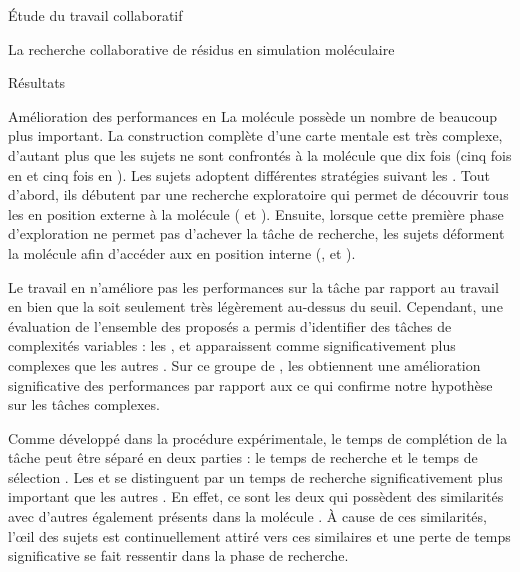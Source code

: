 \documentclass[myfrancais]{mythesis}
\begin{document}
\begin{mypart}{Étude du travail collaboratif}
\begin{mychapter}{La recherche collaborative de résidus en simulation moléculaire}
\begin{mysection}{Résultats}
\begin{mysubsection}{Amélioration des performances en }
					La molécule \myPrion possède un nombre de  beaucoup plus important.
					La construction complète d'une carte mentale est très complexe, d'autant plus que les sujets ne sont confrontés à la molécule que dix fois (cinq fois en  et cinq fois en ).
					Les sujets adoptent différentes stratégies suivant les .
					Tout d'abord, ils débutent par une recherche exploratoire qui permet de découvrir tous les   en position externe à la molécule ( et ).
					Ensuite, lorsque cette première phase d'exploration ne permet pas d'achever la tâche de recherche, les sujets déforment la molécule afin d'accéder aux  en position interne (,  et ).

					Le travail en  n'améliore pas les performances sur la tâche par rapport au travail en  bien que la \mypvalue soit seulement très légèrement au-dessus du seuil.
					Cependant, une évaluation de l'ensemble des  proposés a permis d'identifier des tâches de complexités variables : les  ,  et  apparaissent comme significativement plus complexes que les autres .
					Sur ce groupe de , les  obtiennent une amélioration significative des performances par rapport aux  ce qui confirme notre hypothèse  sur les tâches complexes.

					Comme développé dans la procédure expérimentale, le temps de complétion de la tâche peut être séparé en deux parties : le temps de recherche et le temps de sélection .
					Les   et  se distinguent par un temps de recherche significativement plus important que les autres .
					En effet, ce sont les deux  qui possèdent des similarités avec d'autres  également présents dans la molécule .
					À cause de ces similarités, l'œil des sujets est continuellement attiré vers ces  similaires et une perte de temps significative se fait ressentir dans la phase de recherche.


\end{mysubsection}
\end{mysection}
\end{mychapter}
\end{mypart}
\end{document}
